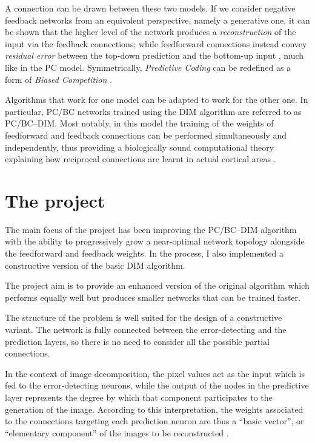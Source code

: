 \documentclass[11pt,a4paper]{report}
\newcommand{\quot}[1]{``#1''}
\begin{document}
			A connection can be drawn between these two models. If we consider negative feedback networks from an equivalent perspective, namely a generative one, it can be shown that the higher level of the network produces a \emph{reconstruction} of the input via the feedback connections; while feedforward connections instead convey \emph{residual error} between the top-down prediction and the bottom-up input \cite{spratling2009unsupervised}, much like in the PC model. Symmetrically, \emph{Predictive Coding} can be redefined as a form of \emph{Biased Competition} \cite{spratling2008predictive,spratling2008reconciling}.
		
			Algorithms that work for one model can be adapted to work for the other one. In particular, PC/BC networks trained using the DIM algorithm are referred to as PC/BC--DIM. Most notably, in this model the training of the weights of feedforward and feedback connections can be performed simultaneously and independently, thus providing a biologically sound computational theory explaining how reciprocal connections are learnt in actual cortical areas \cite{callaway1998local,spratling2012unsupervised}.
		
		\newpage
		
		\section{The project}
			The main focus of the project has been improving the PC/BC--DIM algorithm with the ability to progressively grow a near-optimal network topology alongside the feedforward and feedback weights. In the process, I also implemented a constructive version of the basic DIM algorithm.
		
			The project aim is to provide an enhanced version of the original algorithm which performs equally well but produces smaller networks that can be trained faster.
		
			The structure of the problem is well suited for the design of a constructive variant. The network is fully connected between the error-detecting and the prediction layers, so there is no need to consider all the possible partial connections.
		
			In the context of image decomposition, the pixel values act as the input which is fed to the error-detecting neurons, while the output of the nodes in the predictive layer represents the degree by which that component participates to the generation of the image. According to this interpretation, the weights associated to the connections targeting each prediction neuron are thus a \quot{basic vector}, or \quot{elementary component} of the images to be reconstructed \cite{spratling2014predictive}.
\end{document}
